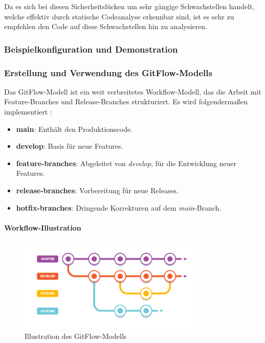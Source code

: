 Da es sich bei diesen Sicherheitslücken um sehr gängige Schwachstellen handelt, welche effektiv durch statische Codeanalyse erkennbar sind, ist es sehr zu empfehlen den Code auf diese Schwachstellen hin zu analysieren.

\subsubsection{Beispielkonfiguration und Demonstration}

\subsubsection{Erstellung und Verwendung des GitFlow-Modells}

Das GitFlow-Modell ist ein weit verbreitetes Workflow-Modell, das die Arbeit mit Feature-Branches und Release-Branches strukturiert. Es wird folgendermaßen implementiert \cite{Driessen2010}:

\begin{itemize}
    \item \textbf{main}: Enthält den Produktionscode.
    \item \textbf{develop}: Basis für neue Features.
    \item \textbf{feature-branches}: Abgeleitet von \textit{develop}, für die Entwicklung neuer Features.
    \item \textbf{release-branches}: Vorbereitung für neue Releases.
    \item \textbf{hotfix-branches}: Dringende Korrekturen auf dem \textit{main}-Branch.
\end{itemize}

\paragraph{Workflow-Illustration}

\begin{figure}[h!]
\centering
\includegraphics[width=0.8\textwidth]{img/gitflow_workflow.png}
\caption{Illustration des GitFlow-Modells}
\label{fig:gitflow}
\end{figure}

